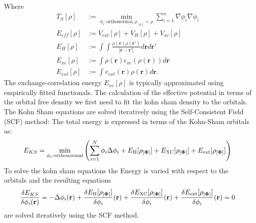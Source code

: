 Where
\begin{align}\label{eq:kin}
    T_S[\rho] &:=\min _{\phi_i: \text {orthonormal}, \rho_{[\phi]}=\rho }\sum\limits_{i=1}^n\nabla\phi_i \nabla \phi_i\\
    E_{eff}[\rho] &:= V_{ext}[\rho] + V_H[\rho] + V_{xc}[\rho]\\
    E_H[\rho] &:= \int\int \frac{\rho(\mathbf{r})\rho(\mathbf{r'})}{|\mathbf{r}-\mathbf{r'}|}d\mathbf{r}d\mathbf{r'}\\
    E_{xc}[\rho] &:= \int \rho(\mathbf{r})\epsilon_{xc}(\rho(\mathbf{r}))d\mathbf{r}\\
    E_{ext}[\rho] &:= \int v_{ext}(\mathbf{r})\rho(\mathbf{r})d\mathbf{r}.
\end{align}
The exchange-correlation energy $E_{xc}[\rho]$ is typically approximated using empirically fitted functionals. The calculation of the effective potential in terms of the orbital free density we first need to fit the kohn sham density to the orbitals.\\
The Kohn Sham equations are solved iteratively using the Self-Consistent Field (SCF) method:
The total energy is expressed in terms of the Kohn-Sham orbitals as:
\begin{align}
    E_{KS} = \min _{\phi_i: \text {orthonormal}} \left( \sum_{i=1}^N \phi_i \Delta \phi_i + E_\text{H}[\rho_{[\mathbf{\Phi}]}]+ E_\text{XC}[\rho_{[\mathbf{\Phi}]}]+E_\text{ext}[\rho_{[\mathbf{\Phi}]}]\right)
\end{align}
To solve the kohn sham equations the Energy is varied with respect to the orbitals and the resulting equations
\begin{align}
    \frac{\delta E_{KS}}{\delta \phi_i(\mathbf{r})} = -\Delta \phi_i(\mathbf{r}) + \frac{\delta E_\text{H}[\rho_{[\mathbf{\Phi}]}]}{\delta \phi_i}(\mathbf{r}) + \frac{\delta E_\text{XC}[\rho_{[\mathbf{\Phi}]}]}{\delta \phi_i}(\mathbf{r}) + \frac{\delta E_\text{ext}[\rho_{[\mathbf{\Phi}]}]}{\delta \phi_i}(\mathbf{r}) = 0
\end{align}
 are solved iteratively using the SCF method.
